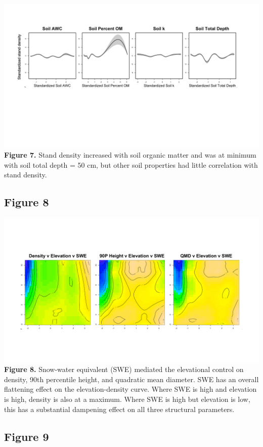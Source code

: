 \documentclass[
  12pt,
]{article}
\begin{document}
\includegraphics{./Figures/Fig7.png} \textbf{Figure 7.} Stand density
increased with soil organic matter and was at minimum with soil total
depth = 50 cm, but other soil properties had little correlation with
stand density. \clearpage

\newpage

\hypertarget{figure-8}{%
\subsection{Figure 8}\label{figure-8}}

\includegraphics{./Figures/Fig8.png} \textbf{Figure 8.} Snow-water
equivalent (SWE) mediated the elevational control on density, 90th
percentile height, and quadratic mean diameter. SWE has an overall
flattening effect on the elevation-density curve. Where SWE is high and
elevation is high, density is also at a maximum. Where SWE is high but
elevation is low, this has a substantial dampening effect on all three
structural parameters. \clearpage

\newpage

\hypertarget{figure-9}{%
\subsection{Figure 9}\label{figure-9}}
\end{document}
